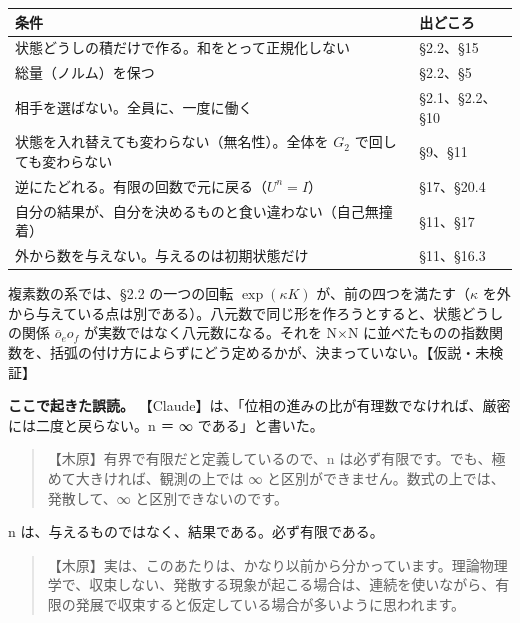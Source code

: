 \documentclass[
  a4paper,
]{ltjsarticle}
\newcounter{none} %
\begin{document}
{\def\LTcaptype{none} %
\begin{longtable}[]{@{}
  >{\raggedright\arraybackslash}p{}
  >{\raggedright\arraybackslash}p{}@{}}
\toprule\noalign{}
\begin{minipage}[b]{\linewidth}\raggedright
条件
\end{minipage} & \begin{minipage}[b]{\linewidth}\raggedright
出どころ
\end{minipage} \\
\midrule\noalign{}
\endhead
\bottomrule\noalign{}
\endlastfoot
状態どうしの積だけで作る。和をとって正規化しない & §2.2、§15 \\
総量（ノルム）を保つ & §2.2、§5 \\
相手を選ばない。全員に、一度に働く & §2.1、§2.2、§10 \\
状態を入れ替えても変わらない（無名性）。全体を \(G_2\)
で回しても変わらない & §9、§11 \\
逆にたどれる。有限の回数で元に戻る（\(U^n = I\)） & §17、§20.4 \\
自分の結果が、自分を決めるものと食い違わない（自己無撞着） & §11、§17 \\
外から数を与えない。与えるのは初期状態だけ & §11、§16.3 \\
\end{longtable}
}

複素数の系では、§2.2 の一つの回転 \(\exp(\kappa K)\)
が、前の四つを満たす（\(\kappa\)
を外から与えている点は別である）。八元数で同じ形を作ろうとすると、状態どうしの関係
\(\bar o_e o_f\) が実数ではなく八元数になる。それを N×N
に並べたものの指数関数を、括弧の付け方によらずにどう定めるかが、決まっていない。【仮説・未検証】

\textbf{ここで起きた誤読。}
【Claude】は、「位相の進みの比が有理数でなければ、厳密には二度と戻らない。n
＝ ∞ である」と書いた。

\begin{quote}
【木原】有界で有限だと定義しているので、n
は必ず有限です。でも、極めて大きければ、観測の上では ∞
と区別ができません。数式の上では、発散して、∞ と区別できないのです。
\end{quote}

n は、与えるものではなく、結果である。必ず有限である。

\begin{quote}
【木原】実は、このあたりは、かなり以前から分かっています。理論物理学で、収束しない、発散する現象が起こる場合は、連続を使いながら、有限の発展で収束すると仮定している場合が多いように思われます。
\end{quote}
\end{document}
